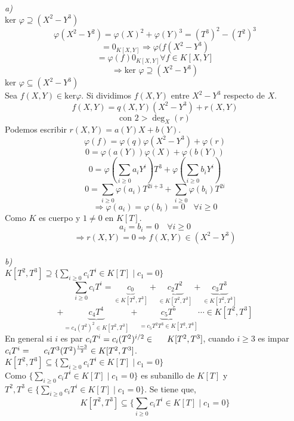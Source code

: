 \documentclass{article}
\begin{document}
\begin{multicols}{2}
\section{}
\textit{a)}\\
\indent $\boxed{\text{ker }\varphi \supseteq (X^2 -Y^3)}$
$$
\varphi(X^2 - Y^2) = \varphi(X)^2 + \varphi(Y)^3 = (T^3)^2 - (T^2)^3
$$
$$
= 0_{K[X,Y]} \Rightarrow \varphi(f(X^2 -Y^3)
$$
$$
= \varphi(f) 0_{K[X,Y]} \forall f\in K[X,Y]
$$
$$
\Rightarrow \text{ker }\varphi \supseteq (X^2 -Y^3)
$$
\indent $\boxed{\text{ker }\varphi \subseteq (X^2 -Y^3)}$\\
\indent Sea $f(X,Y)\in \text{ker}\varphi$. Si dividimos $f(X,Y)$ entre \indent $X^2-Y^3$ respecto de $X$.
$$
f(X,Y) = q(X,Y) (X^2 - Y^3) + r(X,Y)
$$
$$
\text{con } 2>\deg_X(r)
$$
\indent Podemos escribir $r(X,Y) = a(Y)X + b(Y)$.
$$
\varphi(f)=\varphi(q)\varphi(X^2-Y^3)+\varphi(r)
$$
$$
0 = \varphi(a(Y))\varphi(X)+\varphi(b(Y))
$$
$$
0 = \varphi(\sum_{i\ge 0}a_iY^i)T^3+\varphi(\sum_{i\ge 0}b_iY^i)
$$
$$
0 = \sum_{i\ge 0}\varphi(a_i)T^{2i+3}+\sum_{i\ge 0}\varphi(b_i)T^{2i}
$$
$$
\Rightarrow \varphi(a_i)=\varphi(b_i)=0 \quad \forall i \ge 0
$$
\indent Como $K$ es cuerpo y $1\ne 0$ en $K[T]$.
$$
a_i = b_i = 0 \quad \forall i \ge 0
$$
$$
\Rightarrow r(X,Y) = 0 \Rightarrow f(X,Y)\in (X^2 - Y^3)
$$
\\
\indent \textit{b)}\\
\indent $\boxed{K[T^2,T^3] \supseteq \{\sum_{i\ge 0} c_i T^i \in K[T]\mid c_1 = 0\}}$\\
$$
\sum_{i\ge 0} c_i T^i = \underbrace{c_0}_{\in K[T^2,T^3]} + \underbrace{c_2T^2}_{\in K[T^2,T^3]} + \underbrace{c_3 T^3}_{\in K[T^2,T^3]}
$$
$$
+ \underbrace{c_4 T^4}_{= c_4 (T^2)^2\in K[T^2,T^3]} + \underbrace{c_5 T^5}_{= c_5 T^2T^3\in K[T^2,T^3]} \cdots \in K[T^2,T^3]
$$
\indent En general si $i$ es par $c_i T^i =c_i(T^2)^{i/2} \in \indent K[T^2,T^3]$, cuando $i\ge 3$ es impar $c_iT^i = \indent c_i T^3 (T^2)^{\frac{i-3}{2}} \in K[T^2,T^3]$.\\
\indent $\boxed{K[T^2,T^3] \subseteq \{\sum_{i\ge 0} c_i T^i \in K[T]\mid c_1 = 0\}}$\\
\indent Como $\{\sum_{i\ge 0} c_i T^i \in K[T]\mid c_1 = 0\}$ es subanillo \indent de $K[T]$ y $T^2, T^3 \in \{\sum_{i\ge 0} c_i T^i \in K[T]\mid c_1 = 0\}$. \indent Se tiene que,
$$
K[T^2,T^3] \subseteq \{\sum_{i\ge 0} c_i T^i \in K[T]\mid c_1 = 0\}
$$
\end{multicols}
\end{document}
